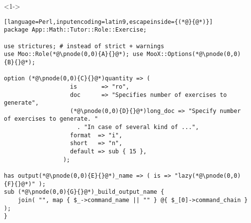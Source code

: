 \documentclass[ngerman,xcolor={table,dvipsnames},smaller,compress,hyperref={bookmarks,colorlinks}]{beamer}
\begin{document}
\begin{frame}[t,fragile]

\begin{block}<1->{}
\scriptsize
\begin{lstlisting}[language=Perl,inputencoding=latin9,escapeinside={(*@}{@*)}]
package App::Math::Tutor::Role::Exercise;

use strictures; # instead of strict + warnings
use Moo::Role(*@\pnode(0,0){A}{}@*); use MooX::Options(*@\pnode(0,0){B}{}@*);

option (*@\pnode(0,0){C}{}@*)quantity => (
                   is       => "ro",
                   doc      => "Specifies number of exercises to generate",
                   (*@\pnode(0,0){D}{}@*)long_doc => "Specify number of exercises to generate. "
                     . "In case of several kind of ...",
                   format  => "i",
                   short   => "n",
                   default => sub { 15 },
                 );

has output(*@\pnode(0,0){E}{}@*)_name => ( is => "lazy(*@\pnode(0,0){F}{}@*)" );
sub (*@\pnode(0,0){G}{}@*)_build_output_name {
    join( "", map { $_->command_name || "" } @{ $_[0]->command_chain } );
}
\end{lstlisting}
\end{block}

\begin{itemize}
\end{itemize}

\end{frame}
\end{document}
